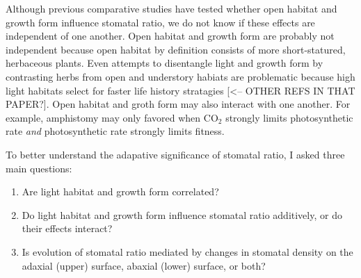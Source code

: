 \documentclass[12pt, oneside]{article}
\begin{document}

Although previous comparative studies have tested whether open habitat and growth form influence stomatal ratio, we do not know if these effects are independent of one another. Open habitat and growth form are probably not independent because open habitat by definition consists of more short-statured, herbaceous plants. Even attempts to disentangle light and growth form by contrasting herbs from open and understory habiats \citep{Salisbury_1927} are problematic because high light habitats select for faster life history stratagies \citep{Galloway_Etterson_2007} [<-- OTHER REFS IN THAT PAPER?]. Open habitat and groth form may also interact with one another. For example, amphistomy may only favored when CO$_2$ strongly limits photosynthetic rate \textit{and} photosynthetic rate strongly limits fitness.

To better understand the adapative significance of stomatal ratio, I asked three main questions:

\begin{enumerate}

  \item{Are light habitat and growth form correlated?}
  \item{Do light habitat and growth form influence stomatal ratio additively, or do their effects interact?}
  \item{Is evolution of stomatal ratio mediated by changes in stomatal density on the adaxial (upper) surface, abaxial (lower) surface, or both?}
  
\end{enumerate}
\end{document}
